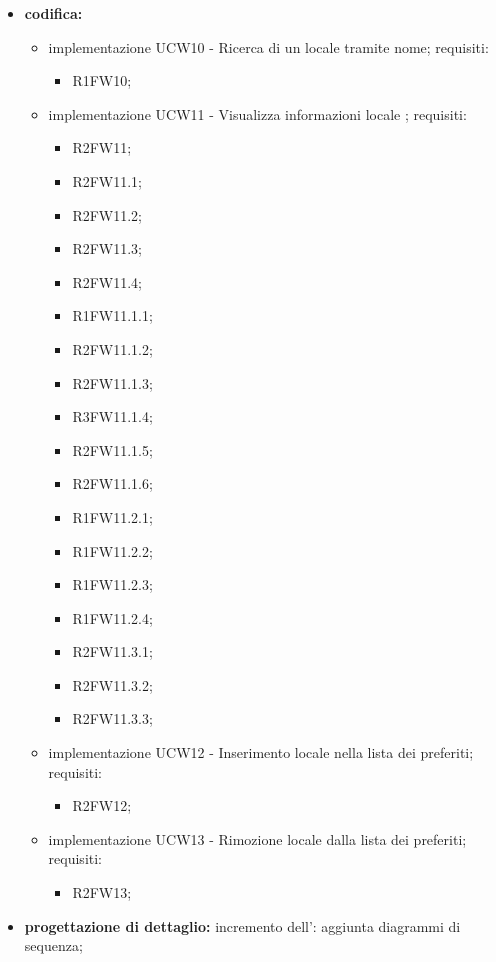 \begin{itemize}
	\item \textbf{codifica:} 
			\begin{itemize}
				\item implementazione UCW10 - Ricerca di un locale tramite nome; requisiti:
					\begin{itemize}
						\item R1FW10;
					\end{itemize}
				\item implementazione UCW11 - Visualizza informazioni locale ; requisiti:
					\begin{itemize}
						\item R2FW11;
						\item R2FW11.1;
						\item R2FW11.2;
						\item R2FW11.3;
						\item R2FW11.4;
      					\item R1FW11.1.1;
           				\item R2FW11.1.2;
               			\item R2FW11.1.3;
                  		\item R3FW11.1.4;
                   		\item R2FW11.1.5;
						\item R2FW11.1.6;
						\item R1FW11.2.1;
						\item R1FW11.2.2;
						\item R1FW11.2.3;
						\item R1FW11.2.4;
						\item R2FW11.3.1;
						\item R2FW11.3.2;
						\item R2FW11.3.3;
					\end{itemize}
				\item implementazione UCW12 - Inserimento locale nella lista dei preferiti; requisiti:
					\begin{itemize}
						\item R2FW12;
					\end{itemize}
				\item implementazione UCW13 - Rimozione locale dalla lista dei preferiti; requisiti:
					\begin{itemize}
						\item R2FW13;
					\end{itemize}
			\end{itemize}
	\item \textbf{progettazione di dettaglio:} incremento dell’{\SA}: aggiunta diagrammi di sequenza;

\end{itemize}
